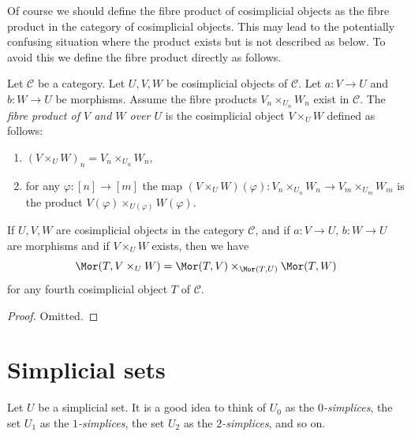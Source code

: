 \noindent
Of course we should define the fibre product of cosimplicial objects
as the fibre product in the category of cosimplicial objects. This
may lead to the potentially confusing situation where the product exists
but is not described as below. To avoid this we define the fibre product
directly as follows.

\begin{definition}
\label{definition-fibre-product-cosimplicial-objects}
Let $\mathcal{C}$ be a category.
Let $U, V, W$ be cosimplicial objects of $\mathcal{C}$.
Let $a : V \to U$ and $b : W \to U$ be morphisms.
Assume the fibre products $V_n \times_{U_n} W_n$ exist in $\mathcal{C}$.
The {\it fibre product of $V$ and $W$ over $U$} is the cosimplicial object
$V \times_U W$ defined as follows:
\begin{enumerate}
\item $(V \times_U W)_n = V_n \times_{U_n} W_n$,
\item for any $\varphi : [n] \to [m]$ the map
$(V \times_U W)(\varphi) : V_n \times_{U_n} W_n \to V_m \times_{U_m} W_m$
is the product $V(\varphi) \times_{U(\varphi)} W(\varphi)$.
\end{enumerate}
\end{definition}

\begin{lemma}
\label{lemma-fibre-product-cosimplicial-objects}
If $U, V, W$ are cosimplicial objects in the category $\mathcal{C}$,
and if $a : V \to U$, $b : W \to U$ are morphisms
and if $V \times_U W$ exists, then we have
$$
\Mor(T, V \times_U W) =
\Mor(T, V) \times_{\Mor(T, U)}
\Mor(T, W)
$$
for any fourth cosimplicial object $T$ of $\mathcal{C}$.
\end{lemma}

\begin{proof}
Omitted.
\end{proof}














\section{Simplicial sets}
\label{section-simplicial-set}

\noindent
Let $U$ be a simplicial set. It is a good idea to think of
$U_0$ as the {\it $0$-simplices}, the set $U_1$ as the
{\it $1$-simplices},
the set $U_2$ as the {\it $2$-simplices}, and so on.

